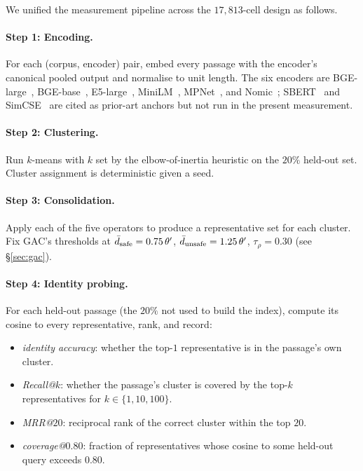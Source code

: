 We unified the measurement pipeline across the $17{,}813$-cell
design as follows.

\paragraph{Step 1: Encoding.} For each (corpus, encoder) pair,
embed every passage with the encoder's canonical pooled output
and normalise to unit length. The six encoders are
BGE-large~\cite{xiao2023bge}, BGE-base~\cite{xiao2023bge},
E5-large~\cite{wang2022e5}, MiniLM~\cite{wang2020minilm},
MPNet~\cite{song2020mpnet}, and Nomic~\cite{nussbaum2024nomic};
SBERT~\cite{reimers2019sbert} and SimCSE~\cite{gao2021simcse}
are cited as prior-art anchors but not run in the present
measurement.

\paragraph{Step 2: Clustering.} Run $k$-means with $k$ set by the
elbow-of-inertia heuristic on the $20\%$ held-out set. Cluster
assignment is deterministic given a seed.

\paragraph{Step 3: Consolidation.} Apply each of the five operators
to produce a representative set for each cluster. Fix GAC's
thresholds at $\bar{d}_{\mathrm{safe}} = 0.75\,\theta'$,
$\bar{d}_{\mathrm{unsafe}} = 1.25\,\theta'$, $\tau_\rho = 0.30$
(see \S\ref{sec:gac}).

\paragraph{Step 4: Identity probing.} For each held-out passage
(the $20\%$ not used to build the index), compute its cosine
to every representative, rank, and record:
\begin{itemize}[leftmargin=1.8em, itemsep=2pt]
\item \emph{identity accuracy}: whether the top-$1$ representative
is in the passage's own cluster.
\item \emph{Recall@$k$}: whether the passage's cluster is covered by
the top-$k$ representatives for $k \in \{1, 10, 100\}$.
\item \emph{MRR@$20$}: reciprocal rank of the correct cluster within
the top $20$.
\item \emph{coverage@$0.80$}: fraction of representatives whose
cosine to some held-out query exceeds $0.80$.
\end{itemize}

